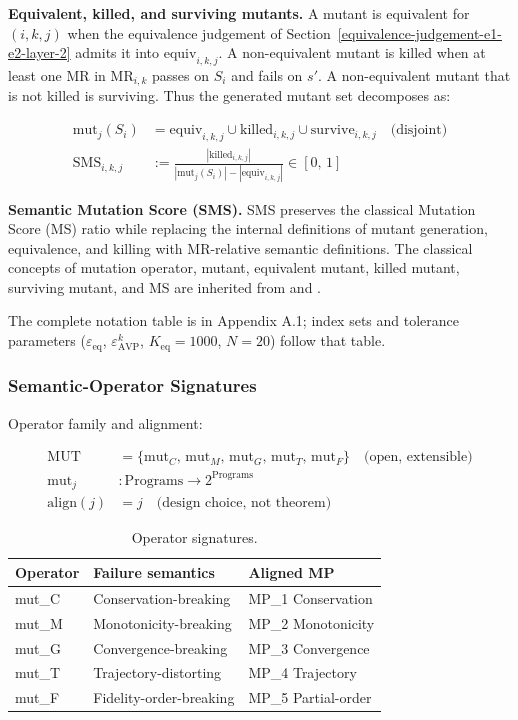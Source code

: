 \documentclass[manuscript,screen,review]{acmart}
\begin{document}
\textbf{Equivalent, killed, and surviving mutants.} A mutant is
equivalent for \((i,k,j)\) when the equivalence judgement of Section~\ref{equivalence-judgement-e1-e2-layer-2} admits
it into \(\mathrm{equiv}_{i,k,j}\). A non-equivalent mutant is killed when
at least one MR in \(\mathrm{MR}_{i,k}\) passes on \(S_i\) and fails on
\(s'\). A non-equivalent mutant that is not killed is surviving. Thus
the generated mutant set decomposes as:

\begin{align*}
\mathrm{mut}_j(S_i) &= \mathrm{equiv}_{i,k,j} \cup \mathrm{killed}_{i,k,j} \cup \mathrm{survive}_{i,k,j} \quad \text{(disjoint)} \\
\mathrm{SMS}_{i,k,j} &:= \frac{|\mathrm{killed}_{i,k,j}|}{|\mathrm{mut}_j(S_i)| - |\mathrm{equiv}_{i,k,j}|} \in [0,\,1]
\end{align*}

\textbf{Semantic Mutation Score (SMS).} SMS preserves the classical
Mutation Score (MS) ratio while replacing the internal definitions of
mutant generation, equivalence, and killing with MR-relative semantic
definitions. The classical concepts of mutation operator, mutant,
equivalent mutant, killed mutant, surviving mutant, and MS are inherited
from \citet{jia2011analysis} and
\citet{ammann2008introduction}.

The complete notation table is in Appendix A.1; index sets and tolerance
parameters ($\varepsilon_{\mathrm{eq}}$, $\varepsilon_{\mathrm{AVP}}^k$,
$K_{\mathrm{eq}} = 1000$, $N = 20$) follow that table.

\subsubsection{Semantic-Operator Signatures}\label{operator-signatures}

Operator family and alignment:

\begin{align*}
\mathrm{MUT} &= \{\mathrm{mut}_C,\, \mathrm{mut}_M,\, \mathrm{mut}_G,\, \mathrm{mut}_T,\, \mathrm{mut}_F\} \quad \text{(open, extensible)} \\
\mathrm{mut}_j &: \text{Programs} \to 2^{\text{Programs}} \\
\mathrm{align}(j) &= j \quad \text{(design choice, not theorem)}
\end{align*}

\begin{table}[t]
\caption{Operator signatures.}\label{tab:p2-01}
\centering
\begin{tabular}{@{}lll@{}}
\toprule
Operator & Failure semantics & Aligned MP \\
\midrule
mut\_C & Conservation-breaking & MP\_1 Conservation \\
mut\_M & Monotonicity-breaking & MP\_2 Monotonicity \\
mut\_G & Convergence-breaking & MP\_3 Convergence \\
mut\_T & Trajectory-distorting & MP\_4 Trajectory \\
mut\_F & Fidelity-order-breaking & MP\_5 Partial-order \\
\bottomrule
\end{tabular}
\end{table}
\end{document}
